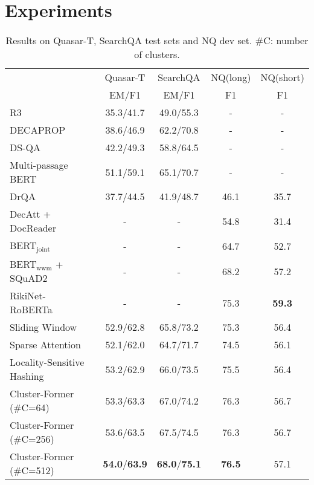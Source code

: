 


\section{Experiments}

\begin{table*}[t]
\centering
\begin{tabular}{lcccc}
\toprule
                           & Quasar-T & SearchQA  & NQ(long) & NQ(short) \\
                           & EM/F1     & EM/F1     & F1       & F1        \\
\midrule                
R3~\citep{wang2018r}                         & 35.3/41.7 & 49.0/55.3 & -        & -         \\
DECAPROP~\citep{tay2018densely} &38.6/46.9 & 62.2/70.8 &- &-\\
DS-QA~\citep{lin2018denoising}                      & 42.2/49.3 & 58.8/64.5 & -        & -         \\
Multi-passage BERT~\citep{wang2019multi}         & 51.1/59.1 & 65.1/70.7 & -        & -         \\
DrQA~\citep{chen2017reading}                       & 37.7/44.5 & 41.9/48.7 & 46.1     & 35.7      \\
DecAtt + DocReader~\citep{kwiatkowski2019natural}         & -         & -         & 54.8     & 31.4      \\
BERT$_{\text{joint}}$~\citep{alberti2019bert}                  & -         & -         & 64.7     & 52.7      \\
BERT$_{\text{wwm}}$ + SQuAD2~\citep{pan2019frustratingly} & -         & -         & 68.2    & 57.2       \\
RikiNet-RoBERTa~\citep{liu2020rikinet} & -         & -         & 75.3    & \textbf{59.3}       \\
\midrule
Sliding Window   & 52.9/62.8 & 65.8/73.2 & 75.3     & 56.4\\
Sparse Attention~\citep{sparsetransf}               & 52.1/62.0 & 64.7/71.7 & 74.5     & 56.1\\
Locality-Sensitive Hashing~\citep{reformer}       & 53.2/62.9 & 66.0/73.5 & 75.5     & 56.4\\
\midrule
Cluster-Former (\#C=64)        & 53.3/63.3 & 67.0/74.2 & 76.3     & 56.7\\
Cluster-Former (\#C=256)       & 53.6/63.5 & 67.5/74.5 & 76.3     & 56.7\\
Cluster-Former (\#C=512)       & \textbf{54.0}/\textbf{63.9} & \textbf{68.0}/\textbf{75.1} & \textbf{76.5}     & 57.1\\
\bottomrule
\end{tabular}
\caption{  Results on Quasar-T, SearchQA test sets and NQ dev set.  \#C: number of clusters.}
\label{tbl:qa}
\end{table*}

